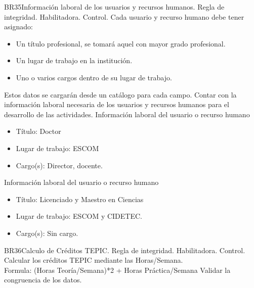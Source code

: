 \begin{BussinesRule}{BR35}{Información laboral de los usuarios y recursos humanos.}
    \BRitem[Tipo:] Regla de integridad.
    \BRitem[Clase:] Habilitadora.
    \BRitem[Nivel:] Control.
    \BRitem[Descripción:] Cada usuario y recurso humano debe tener asignado:
    \begin{itemize}
        \item Un título profesional, se tomará aquel con mayor grado profesional.
        \item Un lugar de trabajo en la institución.
        \item Uno o varios cargos dentro de su lugar de trabajo.
    \end{itemize}

    Estos datos se cargarán desde un catálogo para cada campo.
    \BRitem[Motivación:] Contar con la información laboral necesaria de los usuarios y recursos humanos para el desarrollo de las actividades.
     Información laboral del usuario o recurso humano
    \begin{itemize}
        \item Título: Doctor
        \item Lugar de trabajo: ESCOM
        \item Cargo(s): Director, docente.
    \end{itemize}
     Información laboral del usuario o recurso humano
    \begin{itemize}
        \item Título: Licenciado y Maestro en Ciencias
        \item Lugar de trabajo: ESCOM y CIDETEC.
        \item Cargo(s): Sin cargo.
    \end{itemize}
 \end{BussinesRule}
 \begin{BussinesRule}{BR36}{Calculo de Créditos TEPIC.}
     \BRitem[Tipo:] Regla de integridad.
     \BRitem[Clase:] Habilitadora.
     \BRitem[Nivel:] Control.
     \BRitem[Descripción:]Calcular los créditos TEPIC mediante las Horas/Semana.\\
     Formula: (Horas Teoría/Semana)*2 + Horas Práctica/Semana
     \BRitem[Motivación:] Validar la congruencia de los datos.
  \end{BussinesRule}

